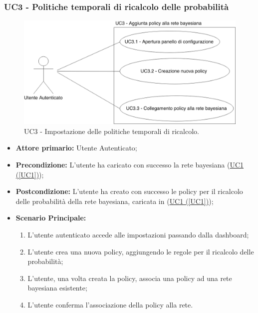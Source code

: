 \subsubsection{UC3 - Politiche temporali di ricalcolo delle probabilità}\label{UC3}

\begin{figure}[H]
\centering
\includegraphics[scale=0.3]{./images/UC3.png}
\caption{UC3 - Impostazione delle politiche temporali di ricalcolo.}
\end{figure}


\begin{itemize}
	\item \textbf{Attore primario:} Utente Autenticato; 
	\item \textbf{Precondizione:} L'utente ha caricato con successo la rete bayesiana (\hyperref[UC1]{UC1 (\ref*{UC1})});

	\item \textbf{Postcondizione:} L'utente ha creato con successo le policy per il ricalcolo delle probabilità della rete bayesiana, caricata in (\hyperref[UC1]{UC1 (\ref*{UC1})});	
	\item \textbf{Scenario Principale:}

	\begin{enumerate}
		\item L'utente autenticato accede alle impostazioni passando dalla dashboard;
		\item L'utente crea una nuova policy, aggiungendo le regole per il ricalcolo delle probabilità;
		\item L'utente, una volta creata la policy, associa una policy ad una rete bayesiana esistente;
		\item L'utente conferma l'associazione della policy alla rete.
	\end{enumerate}
	
\end{itemize}

